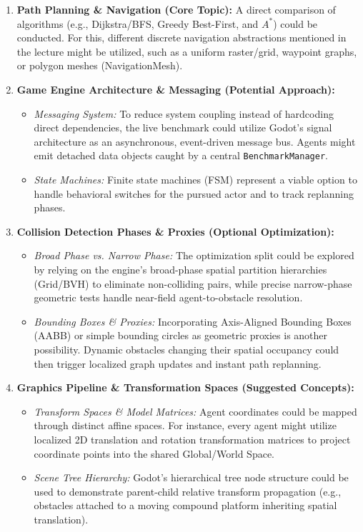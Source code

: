 \documentclass[11pt,a4paper]{article}
\begin{document}
\begin{enumerate}[leftmargin=1.4em]
  \item \textbf{Path Planning \& Navigation (Core Topic):} 
  A direct comparison of algorithms (e.g., Dijkstra/BFS, Greedy Best-First, and $A^*$) could be conducted. For this, different discrete navigation abstractions mentioned in the lecture might be utilized, such as a uniform raster/grid, waypoint graphs, or polygon meshes (NavigationMesh).
  
  \item \textbf{Game Engine Architecture \& Messaging (Potential Approach):} 
  \begin{itemize}
    \item \textit{Messaging System:} To reduce system coupling instead of hardcoding direct dependencies, the live benchmark could utilize Godot's signal architecture as an asynchronous, event-driven message bus. Agents might emit detached data objects caught by a central \texttt{BenchmarkManager}.
    \item \textit{State Machines:} Finite state machines (FSM) represent a viable option to handle behavioral switches for the pursued actor and to track replanning phases.
  \end{itemize}
  
  \item \textbf{Collision Detection Phases \& Proxies (Optional Optimization):} 
  \begin{itemize}
    \item \textit{Broad Phase vs. Narrow Phase:} The optimization split could be explored by relying on the engine's broad-phase spatial partition hierarchies (Grid/BVH) to eliminate non-colliding pairs, while precise narrow-phase geometric tests handle near-field agent-to-obstacle resolution.
    \item \textit{Bounding Boxes \& Proxies:} Incorporating Axis-Aligned Bounding Boxes (AABB) or simple bounding circles as geometric proxies is another possibility. Dynamic obstacles changing their spatial occupancy could then trigger localized graph updates and instant path replanning.
  \end{itemize}
  
  \item \textbf{Graphics Pipeline \& Transformation Spaces (Suggested Concepts):} 
  \begin{itemize}
    \item \textit{Transform Spaces \& Model Matrices:} Agent coordinates could be mapped through distinct affine spaces. For instance, every agent might utilize localized 2D translation and rotation transformation matrices to project coordinate points into the shared Global/World Space.
    \item \textit{Scene Tree Hierarchy:} Godot's hierarchical tree node structure could be used to demonstrate parent-child relative transform propagation (e.g., obstacles attached to a moving compound platform inheriting spatial translation).
  \end{itemize}
  

\end{enumerate}
\end{document}
